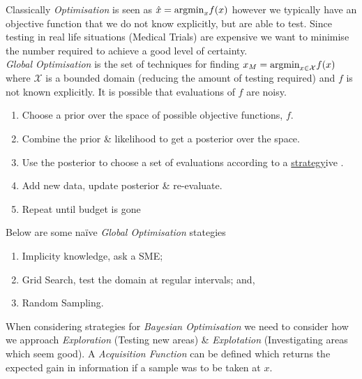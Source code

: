 \documentclass[11pt,a4paper]{article}
\begin{document}
Classically \textit{Optimisation} is seen as $\hat{x}=\mathrm{argmin}_xf(x)$ however we typically have an objective function that we do not know explicitly, but are able to test. Since testing in real life situations (\eg Medical Trials) are expensive we want to minimise the number required to achieve a good level of certainty.\\

\textit{Global Optimisation} is the set of techniques for finding $x_M=\mathrm{argmin}_{x\in\mathcal{X}}f(x)$ where $\mathcal{X}$ is a bounded domain (reducing the amount of testing required) and $f$ is not known explicitly. It is possible that evaluations of $f$ are noisy.\\

\begin{enumerate}[label=\roman*)]
	\item Choose a prior over the space of possible objective functions, $f$.
	\item Combine the prior \& likelihood to get a posterior over the space.
	\item Use the posterior to choose a set of evaluations according to a \underline{strategy}ive
	.
	\item Add new data, update posterior \& re-evaluate.
	\item Repeat until budget is gone
\end{enumerate}

Below are some na\"ive \textit{Global Optimisation} stategies
\begin{enumerate}[label=\roman*)]
	\item Implicity knowledge, ask a SME;
	\item Grid Search, test the domain at regular intervals; and,
	\item Random Sampling.
\end{enumerate}

When considering strategies for \textit{Bayesian Optimisation} we need to consider how we approach \textit{Exploration} (Testing new areas) \& \textit{Explotation} (Investigating areas which seem good). A \textit{Acquisition Function} can be defined which returns the expected gain in information if a sample was to be taken at $x$.\\
\end{document}
